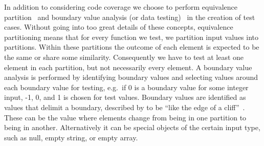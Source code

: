In addition to considering code coverage we choose to perform equivalence partition~\cite[pp.~67-69]{Patton05} and boundary value analysis (or data testing)~\cite[pp.~70-79]{Patton05} in the creation of test cases.
Without going into too great details of these concepts, equivalence partitioning means that for every function we test, we partition input values into partitions.
Within these partitions the outcome of each element is expected to be the same or share some similarity.
Consequently we have to test at least one element in each partition, but not necessarily every element.
A boundary value analysis is performed by identifying boundary values and selecting values around each boundary value for testing, e.g.\ if 0 is a boundary value for some integer input, -1, 0, and 1 is chosen for test values.
Boundary values are identified as values that delimit a boundary, described by \citeauthor{Patton05} to be ``like the edge of a cliff''~\cite[p.~71]{Patton05}.
These can be the value where elements change from being in one partition to being in another.
Alternatively it can be special objects of the certain input type, such as null, empty string, or empty array.
